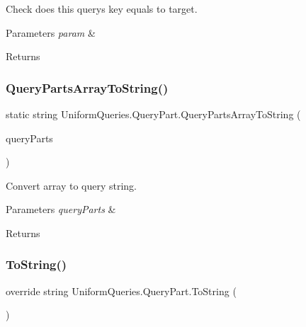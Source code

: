 Check does this query\textquotesingle{}s key equals to target. 


\begin{DoxyParams}{Parameters}
{\em param} & \\
\hline
\end{DoxyParams}
\begin{DoxyReturn}{Returns}

\end{DoxyReturn}
\mbox{\label{struct_uniform_queries_1_1_query_part_a053c8ba08ddd1a20d5b50128a524da09}} 
\subsubsection{\texorpdfstring{Query\+Parts\+Array\+To\+String()}{QueryPartsArrayToString()}}
{\footnotesize\ttfamily static string Uniform\+Queries.\+Query\+Part.\+Query\+Parts\+Array\+To\+String (\begin{DoxyParamCaption}\item[{\mbox{\hyperlink{struct_uniform_queries_1_1_query_part}{Query\+Part}} \mbox{[}$\,$\mbox{]}}]{query\+Parts }\end{DoxyParamCaption})\hspace{0.3cm}{\ttfamily [static]}}



Convert array to query string. 


\begin{DoxyParams}{Parameters}
{\em query\+Parts} & \\
\hline
\end{DoxyParams}
\begin{DoxyReturn}{Returns}

\end{DoxyReturn}
\mbox{\label{struct_uniform_queries_1_1_query_part_acf5597530f693df3804fc2e638805245}} 
\subsubsection{\texorpdfstring{To\+String()}{ToString()}}
{\footnotesize\ttfamily override string Uniform\+Queries.\+Query\+Part.\+To\+String (\begin{DoxyParamCaption}{ }\end{DoxyParamCaption})}



